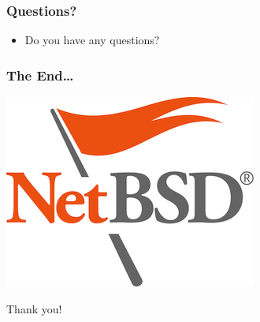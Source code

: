 \documentclass[dvipsnames,table]{beamer}
\begin{document}
\begin{frame}
\frametitle{Questions?}

\begin{itemize}
	\item Do you have any questions?
\end{itemize}
\end{frame}

\begin{frame}
\frametitle{The End\ldots}
\vspace*{-0.8cm}
\begin{center}
\includegraphics[scale=0.5]{NetBSD.png}

Thank you!
\end{center}
\end{frame}

 
\end{document}
